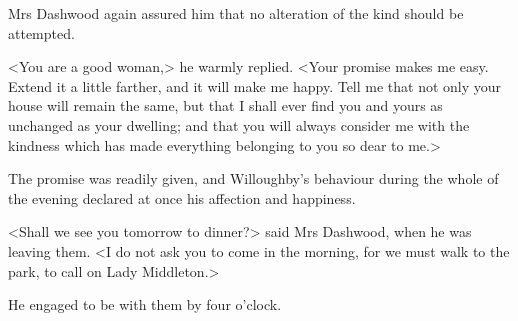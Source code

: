 Mrs Dashwood again assured him that no alteration of the kind should be attempted.

<You are a good woman,> he warmly replied. <Your promise makes me easy. Extend it a little farther, and it will make me happy. Tell me that not only your house will remain the same, but that I shall ever find you and yours as unchanged as your dwelling; and that you will always consider me with the kindness which has made everything belonging to you so dear to me.>

The promise was readily given, and Willoughby's behaviour during the whole of the evening declared at once his affection and happiness.

<Shall we see you tomorrow to dinner?> said Mrs Dashwood, when he was leaving them. <I do not ask you to come in the morning, for we must walk to the park, to call on Lady Middleton.>

He engaged to be with them by four o'clock.